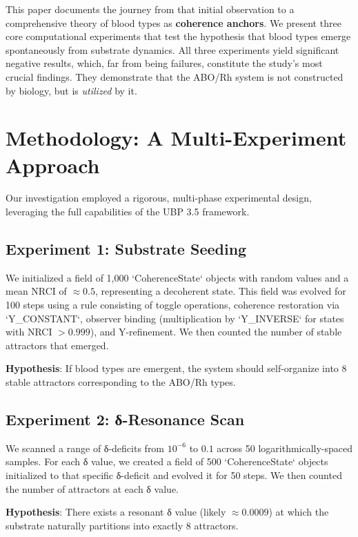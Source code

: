 \documentclass[11pt]{article}
\begin{document}
This paper documents the journey from that initial observation to a comprehensive theory of blood types as \textbf{coherence anchors}. We present three core computational experiments that test the hypothesis that blood types emerge spontaneously from substrate dynamics. All three experiments yield significant negative results, which, far from being failures, constitute the study's most crucial findings. They demonstrate that the ABO/Rh system is not constructed by biology, but is \textit{utilized} by it.

\section{Methodology: A Multi-Experiment Approach}

Our investigation employed a rigorous, multi-phase experimental design, leveraging the full capabilities of the UBP 3.5 framework.

\subsection{Experiment 1: Substrate Seeding}

We initialized a field of 1,000 `CoherenceState` objects with random values and a mean NRCI of $\approx 0.5$, representing a decoherent state. This field was evolved for 100 steps using a rule consisting of toggle operations, coherence restoration via `Y_CONSTANT`, observer binding (multiplication by `Y_INVERSE` for states with NRCI $> 0.999$), and Y-refinement. We then counted the number of stable attractors that emerged.

\textbf{Hypothesis}: If blood types are emergent, the system should self-organize into 8 stable attractors corresponding to the ABO/Rh types.

\subsection{Experiment 2: δ-Resonance Scan}

We scanned a range of δ-deficits from $10^{-6}$ to $0.1$ across 50 logarithmically-spaced samples. For each δ value, we created a field of 500 `CoherenceState` objects initialized to that specific δ-deficit and evolved it for 50 steps. We then counted the number of attractors at each δ value.

\textbf{Hypothesis}: There exists a resonant δ value (likely $\approx 0.0009$) at which the substrate naturally partitions into exactly 8 attractors.
\end{document}
